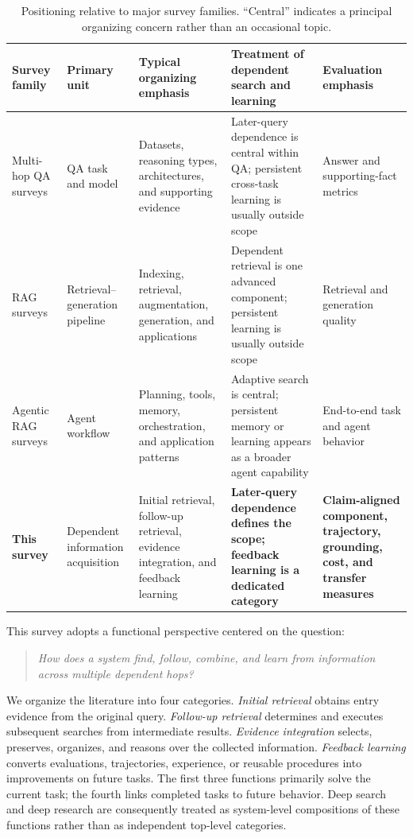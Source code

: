 \begin{table}[tbp]
\centering
\caption{Positioning relative to major survey families. ``Central'' indicates a principal organizing concern rather than an occasional topic.}
\label{tab:survey_positioning}
\small
\begin{tabularx}{\textwidth}{@{}p{2.2cm}p{2.55cm}Yp{3.35cm}p{3.15cm}@{}}
\toprule
Survey family & Primary unit & Typical organizing emphasis & Treatment of dependent search and learning & Evaluation emphasis \\
\midrule
Multi-hop QA surveys~\cite{mavi2022mhqasurvey} & QA task and model & Datasets, reasoning types, architectures, and supporting evidence & Later-query dependence is central within QA; persistent cross-task learning is usually outside scope & Answer and supporting-fact metrics \\
RAG surveys~\cite{gao2023ragsurvey,fan2024ragllmsurvey} & Retrieval--generation pipeline & Indexing, retrieval, augmentation, generation, and applications & Dependent retrieval is one advanced component; persistent learning is usually outside scope & Retrieval and generation quality \\
Agentic RAG surveys~\cite{singh2025agenticragsurvey} & Agent workflow & Planning, tools, memory, orchestration, and application patterns & Adaptive search is central; persistent memory or learning appears as a broader agent capability & End-to-end task and agent behavior \\
\textbf{This survey} & Dependent information acquisition & Initial retrieval, follow-up retrieval, evidence integration, and feedback learning & \textbf{Later-query dependence defines the scope; feedback learning is a dedicated category} & \textbf{Claim-aligned component, trajectory, grounding, cost, and transfer measures} \\
\bottomrule
\end{tabularx}
\end{table}

This survey adopts a functional perspective centered on the question:
\begin{quote}
\emph{How does a system find, follow, combine, and learn from information across multiple dependent hops?}
\end{quote}
We organize the literature into four categories. \emph{Initial retrieval} obtains entry evidence from the original query. \emph{Follow-up retrieval} determines and executes subsequent searches from intermediate results. \emph{Evidence integration} selects, preserves, organizes, and reasons over the collected information. \emph{Feedback learning} converts evaluations, trajectories, experience, or reusable procedures into improvements on future tasks. The first three functions primarily solve the current task; the fourth links completed tasks to future behavior. Deep search and deep research are consequently treated as system-level compositions of these functions rather than as independent top-level categories.

